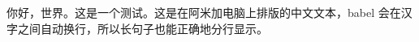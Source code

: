 \documentclass{article}
\begin{document}
你好，世界。这是一个测试。这是在阿米加电脑上排版的中文文本，babel 会在汉字之间自动换行，所以长句子也能正确地分行显示。
\end{document}
